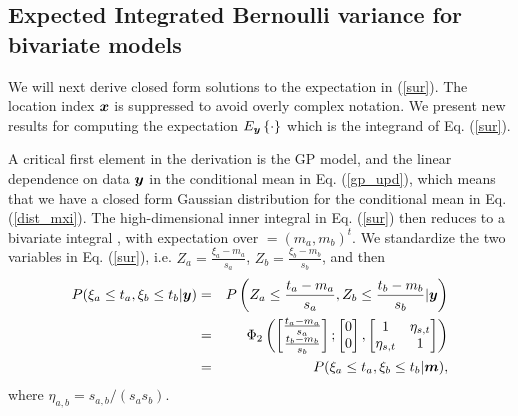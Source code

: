 \documentclass[aoas]{imsart}
\begin{document}
\subsection{Expected Integrated Bernoulli variance for bivariate models}

We will next derive closed form solutions to the expectation in (\ref{sur}). The location index ${\boldsymbol x}$ is suppressed to avoid overly complex notation. We present new results for computing the expectation $E_{{\boldsymbol y}}\left\{ \cdot \right\}$ which is the integrand of Eq. (\ref{sur}).

A critical first
element in the derivation is the GP model, and the linear dependence on data ${\boldsymbol y}$ in the conditional mean in Eq. (\ref{gp_upd}), which means that we have a closed form Gaussian distribution for the conditional mean in Eq. (\ref{dist_mxi}). The high-dimensional inner integral in Eq. (\ref{sur}) then reduces to a bivariate integral \citep{bhattacharjya2013value, chevalier2014fast}, with expectation over $\bm=(m_{a},m_{b})^t$. 
We standardize the two variables in Eq. (\ref{sur}), i.e.
$Z_a=\frac{\xi_a-m_{a}}{s_{a}}$,
$Z_b=\frac{\xi_b-m_{b}}{s_{b}}$, and then
\begin{eqnarray}\label{ytom}
   P(\xi_a \leq t_a, \xi_b \leq t_b|\by) &=& P \left( Z_a \leq\frac{t_a-m_{a}}{s_{a}}, Z_b \leq\frac{t_b-m_{b}}{s_{b}}|\by \right) \nonumber \\
   &=& \Phi_2 \begin{pmatrix} 
\begin{bmatrix} \frac{t_a-m_{a}}{s_{a}}\\
\frac{t_b-m_{b}}{s_{b}}
\end{bmatrix};
 \begin{bmatrix} 0\\
0
\end{bmatrix},\begin{bmatrix}
1 & \eta_{s,t}  \\
\eta_{s,t}   & 1  
\end{bmatrix}\end{pmatrix} \nonumber \\
&=& P(\xi_a \leq t_a, \xi_b \leq t_b|\bm),
\end{eqnarray}
where $\eta_{a,b} =s_{a,b}/(s_{a} s_{b})$.
\end{document}
